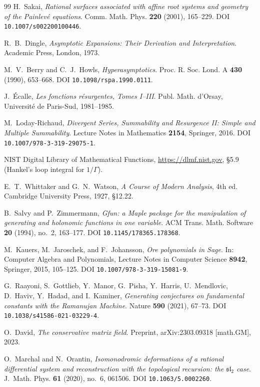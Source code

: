 \documentclass[11pt,reqno]{amsart}
\renewcommand{\_}{\vquadorigunderscore\allowbreak}
\theoremstyle{plain}
\theoremstyle{definition}
\begin{document}
\begin{thebibliography}{99}
H.~Sakai,
\emph{Rational surfaces associated with affine root systems and geometry of the Painlev\'e
equations}.
Comm. Math. Phys. \textbf{220} (2001), 165--229.
DOI \texttt{10.1007/s002200100446}.

R.~B.~Dingle,
\emph{Asymptotic Expansions: Their Derivation and Interpretation}.
Academic Press, London, 1973.

M.~V.~Berry and C.~J.~Howls,
\emph{Hyperasymptotics}.
Proc. R. Soc. Lond. A \textbf{430} (1990), 653--668.
DOI \texttt{10.1098/rspa.1990.0111}.

J.~\'Ecalle,
\emph{Les fonctions r\'esurgentes, Tomes I--III}.
Publ. Math. d'Orsay, Universit\'e de Paris-Sud, 1981--1985.

M.~Loday-Richaud,
\emph{Divergent Series, Summability and Resurgence II: Simple and Multiple Summability}.
Lecture Notes in Mathematics \textbf{2154}, Springer, 2016.
DOI \texttt{10.1007/978-3-319-29075-1}.

NIST Digital Library of Mathematical Functions, \url{https://dlmf.nist.gov}, \S5.9
(Hankel's loop integral for $1/\Gamma$).

E.~T.~Whittaker and G.~N.~Watson,
\emph{A Course of Modern Analysis}, 4th ed.
Cambridge University Press, 1927, \S12.22.

B.~Salvy and P.~Zimmermann,
\emph{Gfun: a Maple package for the manipulation of generating and holonomic functions in one
variable}.
ACM Trans. Math. Software \textbf{20} (1994), no.~2, 163--177.
DOI \texttt{10.1145/178365.178368}.

M.~Kauers, M.~Jaroschek, and F.~Johansson,
\emph{Ore polynomials in Sage}.
In: Computer Algebra and Polynomials, Lecture Notes in Computer Science \textbf{8942},
Springer, 2015, 105--125.
DOI \texttt{10.1007/978-3-319-15081-9\_6}.

G.~Raayoni, S.~Gottlieb, Y.~Manor, G.~Pisha, Y.~Harris, U.~Mendlovic, D.~Haviv, Y.~Hadad, and
I.~Kaminer,
\emph{Generating conjectures on fundamental constants with the Ramanujan Machine}.
Nature \textbf{590} (2021), 67--73.
DOI \texttt{10.1038/s41586-021-03229-4}.

O.~David,
\emph{The conservative matrix field}.
Preprint, arXiv:2303.09318 [math.GM], 2023.

O.~Marchal and N.~Orantin,
\emph{Isomonodromic deformations of a rational differential system and reconstruction with the
topological recursion: the $\mathfrak{sl}_2$ case}.
J.~Math. Phys. \textbf{61} (2020), no.~6, 061506.
DOI \texttt{10.1063/5.0002260}.


\end{thebibliography}
\end{document}
